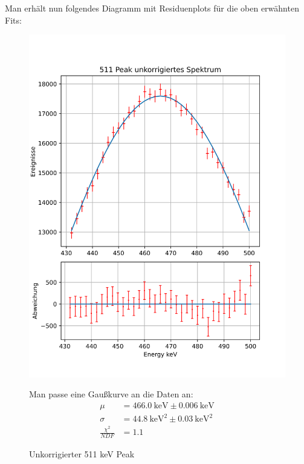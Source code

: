 \documentclass[12pt,twoside,a4paper]{scrartcl}
\begin{document}
		Man erhält nun folgendes Diagramm mit Residuenplots für die oben erwähnten Fits:

		\begin{figure}[H]
			\begin{minipage}{0.49 \textwidth}
				\includegraphics[width = \textwidth]{Plots/EnergyUnkorrigiert511 Peak.png}
				\caption{Unkorrigierter 511 keV Peak}
			\end{minipage}
			\begin{minipage}{0.49 \textwidth}
				Man passe eine Gaußkurve an die Daten an:
				\begin{align*}
					\mu &= \SI{466.0}{\kilo \electronvolt} \pm \SI{0.006}{\kilo \electronvolt} \\
					\sigma &= \SI{44.8}{\kilo \electronvolt \squared} \pm \SI{0.03}{\kilo \electronvolt \squared} \\
					\frac{\chi^2}{NDF} &= 1.1
				\end{align*}
			\end{minipage}
		\end{figure}
\end{document}
